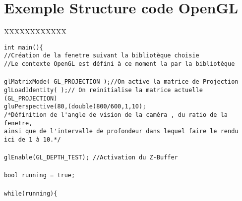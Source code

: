\section{Exemple Structure code OpenGL}

\begin{tabbing}
XXXX\=XXXX\=XXXX\= \kill

\verb|int main(){|\\
\> \verb|//Création de la fenetre suivant la bibliotèque choisie|\\
\> \verb|//Le contexte OpenGL est défini à ce moment la par la bibliotèque|\\
\\	
\> \verb|glMatrixMode( GL_PROJECTION );//On active la matrice de Projection|\\
\> \verb|glLoadIdentity( );// On reinitialise la matrice actuelle (GL_PROJECTION)|\\
\> \verb|gluPerspective(80,(double)800/600,1,10);|\\
\> \verb|/*Définition de l'angle de vision de la caméra , du ratio de la fenetre, |\\
\> \verb|ainsi que de l'intervalle de profondeur dans lequel faire le rendu |\\
\> \verb|ici de 1 à 10.*/|\\
\\
\> \verb|glEnable(GL_DEPTH_TEST); //Activation du Z-Buffer|\\
\\
\> \verb|bool running = true;|\\
\\

\> \verb|while(running){|\\


\end{tabbing}
